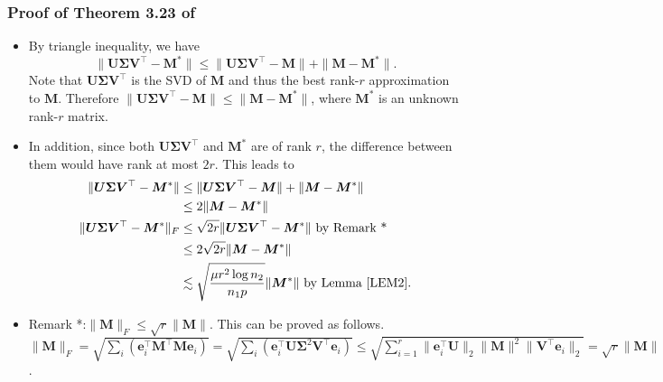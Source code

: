 \documentclass[override]{beamer} %
\newcommand{\bi}{\begin{itemize} \scriptsize} \newcommand{\ei}{\end{itemize}}
\theoremstyle{remark}
\newcommand{\bs}[1]{{\boldsymbol{#1}^*}}
\newcommand{\bb}[1]{{\boldsymbol {#1}}}
\begin{document}
\begin{frame}
\frametitle{Proof of Theorem 3.23 of \cite{Chen:2021}}
\bi
\item By triangle inequality, we have
\[
\|\bb U\bb \Sigma \bb V^\top - \bs M\|
\leq
\|\bb U\bb \Sigma \bb V^\top - \bb M\| +\|\bb M - \bs M\|.
\]
Note that $\bb U\bb \Sigma \bb V^\top$ is the SVD of $\bb M$ and thus the best rank-$r$ approximation to $\bb M$. 
Therefore $\|\bb U\bb \Sigma \bb V^\top - \bb M\| \leq \|\bb M - \bs M\|$, where $\bs M$ is an unknown rank-$r$ matrix.
\item 
In addition, since both $\bb U\bb \Sigma \bb V^\top $ and $\bs M$ are of rank $r$, the difference between them would have rank at most $2r$. This leads to 
\begin{align*}
\|\bb U\bb \Sigma \bb V^\top - \bs M\|
& \leq
\|\bb U\bb \Sigma \bb V^\top - \bb M\| +\|\bb M - \bs M\|\\
& \leq 2\|\bb M - \bs M\| \\
\|\bb U\bb \Sigma \bb V^\top - \bs M\|_F
& \leq \sqrt{2r} \|\bb U\bb \Sigma \bb V^\top - \bs M\| \text{ by Remark *} \\
& \leq 2\sqrt{2r} \|\bb M - \bs M\|\\
& \lesssim \sqrt{\frac{\mu r^2 \log n_2}{n_1 p }} \|\bs M\| \text{ by Lemma \ref{LEM2}}.
\end{align*}
\item Remark *:$ \|\bb M\|_F\leq \sqrt{r}\|\bb M\| $. This can be proved as follows.
$\|\bb M\|_F = \sqrt{\sum_{i} (\bb e_i^\top \bb M^\top \bb M \bb e_i)} 
= \sqrt{\sum_{i} (\bb e_i^\top \bb U \bb \Sigma^2 \bb V^\top \bb e_i)}
\leq \sqrt{\sum_{i = 1}^r\|\bb e_i^\top \bb U\|_2 \|\bb M\|^2 \|\bb V ^\top \bb e_i\|_2 }
= \sqrt{r}\|\bb M\|
$.
\ei

\end{frame}
\end{document}
